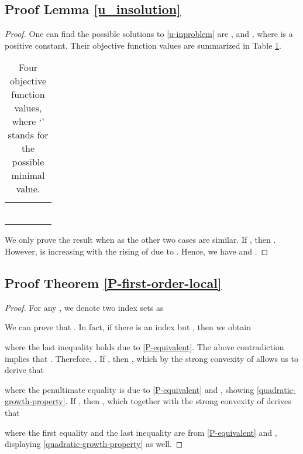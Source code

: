 \documentclass[journal]{IEEEtran}
\begin{document}
\subsection{Proof Lemma \ref{u_insolution}}
\begin{proof} One can find the possible solutions to \eqref{u-inproblem} are , and , where  is a positive constant. Their objective function  values are summarized in Table \ref{obj-values}.

\begin{table}[H]
	\renewcommand{\arraystretch}{1.25}\addtolength{\tabcolsep}{10pt}
\centering
\caption{Four objective function  values, where `' stands for the possible minimal value. \label{obj-values}}
\begin{tabular}{c llll}\hline
 && & & \\\hline
\multirow{2}{*}{ } &  &  &  &    \\
 &&&& \\\hline
\multirow{2}{*}{   } &  &  &  &   \\
 &&&& \\\hline
\multirow{2}{*}{    } &  &  &  &    \\
 &&&& \\\hline
\end{tabular}
\end{table}\vspace{-3mm}
\noindent We only prove the result when  as the other two cases are similar. If  , then  . However,  is increasing with the rising of  due to . Hence, we have  and .
\end{proof}
\subsection{Proof Theorem \ref{P-first-order-local}}
\begin{proof} For any , we denote two index sets as
  
 We can prove that . In fact, if there is  an index  but  , then
 we obtain
  
 where   the last inequality holds due to  \eqref{P-equivalent}. The above   contradiction implies that . Therefore, . If , then , which by the strong convexity of  allows us to derive that
  
 where the penultimate equality is due to \eqref{P-equivalent} and ,  showing \eqref{quadratic-growth-property}. If , then , which together with the strong convexity of   derives that
   
where the first equality and the last inequality are from  \eqref{P-equivalent} and  , displaying \eqref{quadratic-growth-property} as well.
\end{proof}
\end{document}
